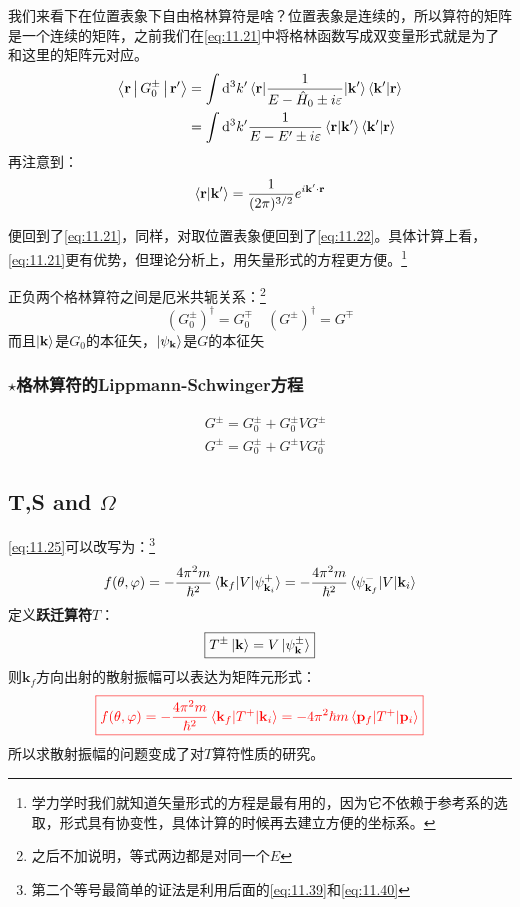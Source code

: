 \documentclass[a4paper,zihao=-4,linespread=1]{ctexrep}
\begin{document}
	我们来看下在位置表象下自由格林算符是啥？位置表象是连续的，所以算符的矩阵是一个连续的矩阵，之前我们在\ref{eq:11.21}中将格林函数写成双变量形式就是为了和这里的矩阵元对应。
	\begin{equation}
		\begin{aligned}
			\Braket{\mathbf{r}|G_0^\pm|\mathbf{r}^\prime}&=\int \mathrm{d}^3k^\prime \braket{\mathbf{r}|\frac{1}{E-\hat{H}_0\pm i\varepsilon}|\mathbf{k}^\prime}\braket{\mathbf{k}^\prime|\mathbf{r}}\\
			&=\int \mathrm{d}^3k^\prime\frac{1}{E-E^\prime\pm i\varepsilon} \braket{\mathbf{r}|\mathbf{k}^\prime}\braket{\mathbf{k}^\prime|\mathbf{r}}
		\end{aligned}
	\end{equation}
	再注意到：
	\[\braket{\mathbf{r}|\mathbf{k}^\prime}=\frac{1}{(2\pi)^{3/2}}e^{i\mathbf{k}^\prime\cdot\mathbf{r}}\]
	
	便回到了\ref{eq:11.21}，同样，对取位置表象便回到了\ref{eq:11.22}。具体计算上看，\ref{eq:11.21}更有优势，但理论分析上，用矢量形式的方程更方便。\footnote{学力学时我们就知道矢量形式的方程是最有用的，因为它不依赖于参考系的选取，形式具有协变性，具体计算的时候再去建立方便的坐标系。}
	
	正负两个格林算符之间是厄米共轭关系：\footnote{之后不加说明，等式两边都是对同一个$E$}
	\begin{equation}
		(G_0^\pm)^\dagger=G_0^\mp \quad (G^\pm)^\dagger=G^\mp
	\end{equation}
	而且$\ket{\mathbf{k}}$是$G_0$的本征矢，$\ket{\psi_\mathbf{k}}$是$G$的本征矢
	\subsubsection*{$\star$格林算符的Lippmann-Schwinger方程}
	\begin{equation}	
		\boxed{
		\begin{aligned}
		&G^\pm=G_0^\pm+G_0^\pm V G^\pm\\
			&G^\pm=G_0^\pm+G^\pm V G_0^\pm
		\end{aligned}}
	\end{equation}
	\subsection{T,S and $\Omega$}
	\ref{eq:11.25}可以改写为：\footnote{第二个等号最简单的证法是利用后面的\ref{eq:11.39}和\ref{eq:11.40}}
	\begin{equation}
		f(\theta,\varphi)=-\frac{4\pi^2m}{\hbar^2}\braket{\mathbf{k}_f|V|\psi^+_{\mathbf{k}_i}}=-\frac{4\pi^2m}{\hbar^2}\braket{\psi^-_{\mathbf{k}_f}|V|\mathbf{k}_i}
	\end{equation}
  	定义\textbf{跃迁算符}$T$：
  	\begin{equation}
  		\boxed{T^{\pm}\ket{\mathbf{k}}=V\ket{\psi^\pm_{\mathbf{k}}}}
  	\end{equation}
  	则$\mathbf{k}_f$方向出射的散射振幅可以表达为矩阵元形式：
  	\begin{equation}
  		\label{eq:11.39}
  		{\color{red}
  		\boxed{f(\theta,\varphi)=-\frac{4\pi^2m}{\hbar^2}\braket{\mathbf{k}_f|T^+|\mathbf{k}_i}=-{4\pi^2\hbar m}\braket{\mathbf{p}_f|T^+|\mathbf{p}_i}}}
  	\end{equation}
  	所以求散射振幅的问题变成了对$T$算符性质的研究。
  	
\end{document}
